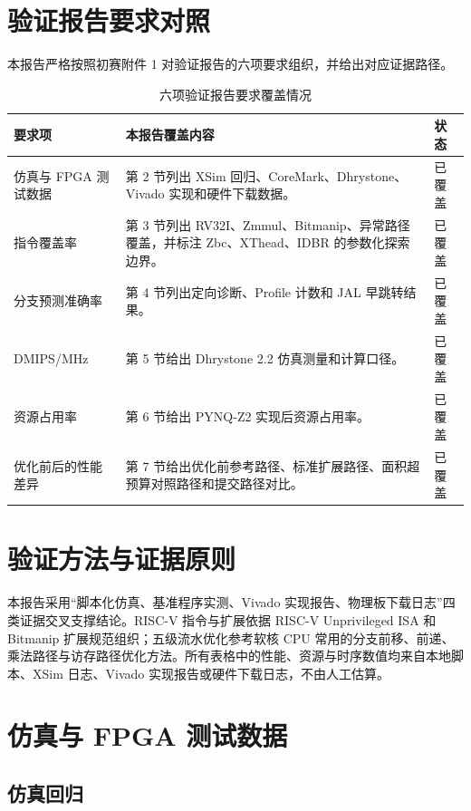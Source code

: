\documentclass[UTF8,a4paper,12pt,fontset=windows]{ctexart}
\begin{document}
\section{验证报告要求对照}

本报告严格按照初赛附件 1 对验证报告的六项要求组织，并给出对应证据路径。

\begin{table}[H]
\centering
\caption{六项验证报告要求覆盖情况}
\begin{tabularx}{\textwidth}{L{3.5cm}Y L{2.2cm}}
\toprule
{}
要求项 & 本报告覆盖内容 & 状态 \\
\midrule
仿真与 FPGA 测试数据 & 第 2 节列出 XSim 回归、CoreMark、Dhrystone、Vivado 实现和硬件下载数据。 & 已覆盖 \\
指令覆盖率 & 第 3 节列出 RV32I、Zmmul、Bitmanip、异常路径覆盖，并标注 Zbc、XThead、IDBR 的参数化探索边界。 & 已覆盖 \\
分支预测准确率 & 第 4 节列出定向诊断、Profile 计数和 JAL 早跳转结果。 & 已覆盖 \\
DMIPS/MHz & 第 5 节给出 Dhrystone 2.2 仿真测量和计算口径。 & 已覆盖 \\
资源占用率 & 第 6 节给出 PYNQ-Z2 实现后资源占用率。 & 已覆盖 \\
优化前后的性能差异 & 第 7 节给出优化前参考路径、标准扩展路径、面积超预算对照路径和提交路径对比。 & 已覆盖 \\
\bottomrule
\end{tabularx}
\end{table}

\section{验证方法与证据原则}

本报告采用“脚本化仿真、基准程序实测、Vivado 实现报告、物理板下载日志”四类证据交叉支撑结论。RISC-V 指令与扩展依据 RISC-V Unprivileged ISA 和 Bitmanip 扩展规范组织\cite{riscv-unprivileged,riscv-bitmanip}；五级流水优化参考软核 CPU 常用的分支前移、前递、乘法路径与访存路径优化方法\cite{rvcorep,rvcorep-m}。所有表格中的性能、资源与时序数值均来自本地脚本、XSim 日志、Vivado 实现报告或硬件下载日志，不由人工估算。

\section{仿真与 FPGA 测试数据}

\subsection{仿真回归}
\end{document}
